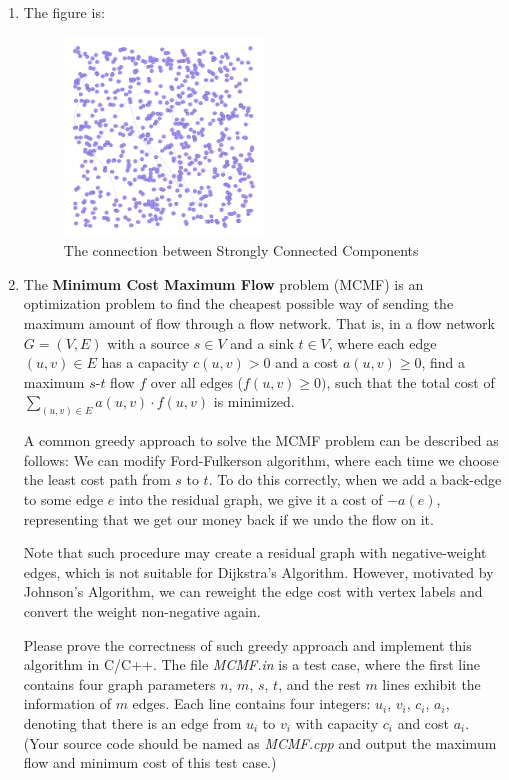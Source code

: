 \documentclass[12pt,a4paper,UTF8]{article}
\makeatletter
\newtheorem*{solution}{Solution}
\theoremstyle{definition}
\renewenvironment{solution}[1][Solution] {\par\pushQED{\qed}\normalfont\topsep6\p@\@plus6\p@\relax\trivlist\item[\hskip\labelsep\bfseries#1\@addpunct{.}]\ignorespaces}{\popQED\endtrivlist\@endpefalse} \makeatother
\makeatother
\begin{document}
\begin{enumerate}
\begin{enumerate}
    \end{enumerate}
    \begin{solution}
    	The figure is:\\
        \begin{figure}[!htbp]
        	\centering
        	\includegraphics[width=0.5\textwidth]{Lab09-YijiaDiao.png}
        	\caption{The connection between Strongly Connected Components }
        	\label{Fig1}
        \end{figure}
    \end{solution}
	\item The \textbf{Minimum Cost Maximum Flow} problem (MCMF) is an optimization problem to find the cheapest possible way of sending the maximum amount of flow through a flow network. That is, in a flow network $G = (V, E)$ with a source $s\in V$ and a sink $t\in V$, where each edge $(u, v)\in E$ has a capacity $c(u,v) > 0$ and a cost $a(u,v) \ge 0$, find a maximum $s\text{-}t$ flow $f$ over all edges ($f(u, v) \ge 0)$, such that the total cost of $\sum_{(u, v) \in E} a(u, v) \cdot f(u, v)$ is minimized.

A common greedy approach to solve the MCMF problem can be described as follows: We can modify Ford-Fulkerson algorithm, where each time we choose the least cost path from $s$ to $t$. To do this correctly, when we add a back-edge to some edge $e$ into the residual graph, we give it a cost of $-a(e)$, representing that we get our money back if we undo the flow on it.

Note that such procedure may create a residual graph with negative-weight edges, which is not suitable for Dijkstra's Algorithm. However, motivated by Johnson's Algorithm, we can reweight the edge cost with vertex labels and convert the weight non-negative again.

Please prove the correctness of such greedy approach and implement this algorithm in C/C++. The file \emph{MCMF.in} is a test case, where the first line contains four graph parameters $n$, $m$, $s$, $t$, and the rest $m$ lines exhibit the information of $m$ edges. Each line contains four integers: $u_i$, $v_i$, $c_i$, $a_i$, denoting that there is an edge from $u_i$ to $v_i$ with capacity $c_i$ and cost $a_i$. {\color{blue}(Your source code should be named as \emph{MCMF.cpp} and output the maximum flow and minimum cost of this test case.)}


\end{enumerate}
\end{document}
